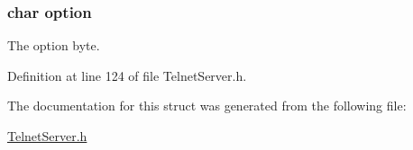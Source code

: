 \hypertarget{struct_telnet_opts__t_a454fa9de3ca009e3082488412cd184d4}{
\subsubsection[{option}]{\setlength{\rightskip}{0pt plus 5cm}char option}}\label{struct_telnet_opts__t_a454fa9de3ca009e3082488412cd184d4}
The option byte. 

Definition at line 124 of file Telnet\-Server.\-h.



The documentation for this struct was generated from the following file\-:\begin{DoxyCompactItemize}
\item 
\hyperlink{_telnet_server_8h}{Telnet\-Server.\-h}\end{DoxyCompactItemize}

